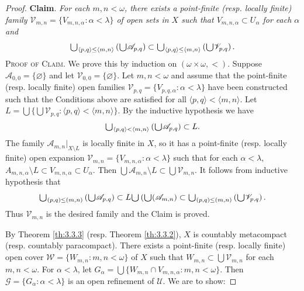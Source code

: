 \documentclass[main.tex]{subfiles}
\begin{document}
\begin{proof}
\textbf{Claim}. \textit{For each $m, n < \omega$, there exists a point-finite 
	(resp. locally finite) family 
$\mathscr{V}_{m,n} = \{V_{m,n,\alpha}: \alpha < \lambda\}$ 
of open sets in $X$ such that $V_{m,n,\alpha} \subset U_\alpha$ 
for each $\alpha$ and}
$$\raisebox{-2pt}{\scalebox{1.5}{$\cup$}}_{\langle p,q \rangle \le \langle m,n \rangle} \left(\raisebox{-2pt}{\scalebox{1.5}{$\cup$}} \mathscr{A}_{p,q}\right) 
\subset \raisebox{-2pt}{\scalebox{1.5}{$\cup$}}_{\langle p,q \rangle \le \langle m,n \rangle} 
\left(\raisebox{-2pt}{\scalebox{1.5}{$\cup$}} \mathscr{V}_{p,q}\right).$$
\textsc{Proof of Claim}. We prove this by induction on 
$(\omega \times \omega, <)$. 
Suppose $\mathscr{A}_{0,0} = \{\varnothing\}$ and let $\mathscr{V}_{0,0} = \{\varnothing\}$.
Let $m, n < \omega$ and assume that the point-finite (resp. locally finite) 
open families $\mathscr{V}_{p,q} = \{V_{p,q,\alpha}: \alpha < \lambda\}$ 
have been constructed such that the Conditions above are satisfied 
for all $\langle p,q \rangle < \langle m,n \rangle$. 
Let $L = \bigcup \{ \bigcup \mathscr{V}_{p,q}: \langle p,q \rangle < \langle m,n \rangle \}$. 
By the inductive hypothesis we have 
$$\raisebox{-2pt}{\scalebox{1.5}{$\cup$}}_{\langle p,q \rangle < \langle m,n \rangle} \left(\raisebox{-2pt}{\scalebox{1.5}{$\cup$}} \mathscr{A}_{p,q}\right) \subset L.$$ 
The family $\mathscr{A}_{m,n}|_{X\setminus L}$ is 
locally finite in $X$, so it has a point-finite (resp. locally finite) 
open expansion $\mathscr{V}_{m,n} = \{V_{m,n,\alpha}: \alpha < \lambda\}$ 
such that for each $\alpha < \lambda$, 
$A_{m,n,\alpha}\setminus L \subset V_{m,n,\alpha}\subset U_\alpha$. 
Then $\bigcup\mathscr{A}_{m,n}\setminus L \subset \bigcup \mathscr{V}_{m,n}$. 
It follows from inductive hypothesis that 
$$\raisebox{-2pt}{\scalebox{1.5}{$\cup$}}_{(p,q)\le(m,n)}\left(\raisebox{-2pt}{\scalebox{1.5}{$\cup$}} \mathscr{A}_{p,q}\right) \subset L\raisebox{-2pt}{\scalebox{1.5}{$\cup$}}\left(\raisebox{-2pt}{\scalebox{1.5}{$\cup$}}(\mathscr{A}_{m,n}\right) \subset 
\raisebox{-2pt}{\scalebox{1.5}{$\cup$}}_{(p,q)\le(m,n)}\left(\raisebox{-2pt}{\scalebox{1.5}{$\cup$}} \mathscr{V}_{p,q}\right).$$
Thus $\mathscr{V}_{m,n}$ is the desired family and the Claim is proved.

By Theorem \ref{th:3.3.3} (resp. Theorem \ref{th:3.3.2}),  $X$  is countably metacompact 
(resp. countably paracompact). There exists a point-finite (resp. locally finite) open cover 
$\mathscr{W} = \{W_{m,n}: m,n < \omega\}$ of  $X$  such that 
$W_{m,n} \subset \bigcup\mathscr{V}_{m,n}$ for each $m, n < \omega$. 
For $\alpha < \lambda$, let $G_\alpha = \bigcup\{W_{m,n}\cap V_{m,n,\alpha}: m,n<\omega\}$. 
Then $\mathscr{G} = \{G_\alpha: \alpha < \lambda\}$ is an open refinement 
of $\mathscr{U}$. We are to show:


\end{proof}
\end{document}
